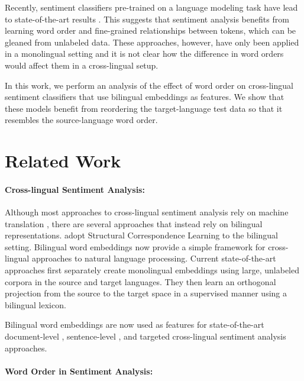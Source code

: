 \documentclass[11pt,a4paper]{article}
\begin{document}
Recently, sentiment classifiers pre-trained on a language modeling task have lead to state-of-the-art results \cite{Peters2018,Howard2018,Devlin2018}. This suggests that sentiment analysis benefits from learning word order and fine-grained relationships between tokens, which can be gleaned from unlabeled data. These approaches, however, have only been applied in a monolingual setting and it is not clear how the difference in word orders would affect them in a cross-lingual setup.

In this work, we perform an analysis of the effect of word order on cross-lingual sentiment classifiers that use bilingual embeddings as features. We show that these models benefit from reordering the target-language test data so that it resembles the source-language word order.


\section{Related Work}

\paragraph{Cross-lingual Sentiment Analysis: }

Although most approaches to cross-lingual sentiment analysis rely on machine translation \cite{Banea2008,Balahur2014d,Klinger2015},
there are several approaches that instead rely on bilingual representations. 
 adopt Structural Correspondence Learning to the
bilingual setting. Bilingual word embeddings \cite{Kocisky2014,Chandar2014,Luong2015} now provide
a simple framework for cross-lingual approaches to natural language processing. Current state-of-the-art approaches \cite{Artetxe2017,Artetxe2018,Lample2017} first separately create monolingual embeddings using large, unlabeled corpora in the source and target languages. They then learn an orthogonal projection from the source to the target space in a supervised manner using a bilingual lexicon. 

Bilingual word embeddings are now used as features for state-of-the-art document-level \cite{Chen2016}, sentence-level \cite{Barnes2018b}, and targeted \cite{Hangya2018} cross-lingual sentiment analysis approaches.


\paragraph{Word Order in Sentiment Analysis: }
\end{document}
